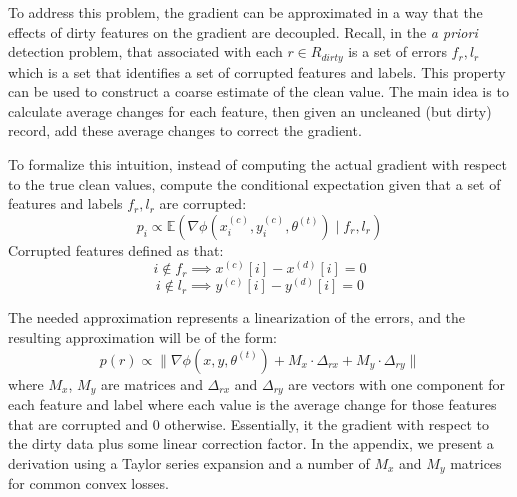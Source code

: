 To address this problem, the gradient can be approximated in a way that the effects of dirty features on the gradient are decoupled.
Recall, in the \emph{a priori} detection problem, that associated with each $r \in R_{dirty}$ is a set of errors $f_r,l_r$ which is a set that identifies a set of corrupted features and labels.
This property can be used to construct a coarse estimate of the clean value.
The main idea is to calculate average changes for each feature, then given an uncleaned (but dirty) record, add these average changes to correct the gradient.

To formalize this intuition, instead of computing the actual gradient with respect to the 
true clean values, compute the conditional expectation given that a set of features and labels $f_r,l_r$ are corrupted:
\[
p_i \propto \mathbb{E}(\nabla\phi(x^{(c)}_i,y^{(c)}_i,\theta^{(t)}) \mid f_r,l_r)
\]
Corrupted features defined as that:
\[
i \notin f_r \implies x^{(c)}[i] - x^{(d)}[i] = 0
\]
\[
i \notin l_r \implies y^{(c)}[i] - y^{(d)}[i] = 0
\]

The needed approximation represents a linearization of the errors, and the resulting approximation will be of the form:
\[
p(r)\propto\|\nabla\phi(x,y,\theta^{(t)}) + M_x \cdot \Delta_{rx} +  M_y \cdot \Delta_{ry}\|
\]
where $M_x$, $M_y$ are matrices and $\Delta_{rx}$ and $\Delta_{ry}$ are vectors with one component for each feature and label where each value is the average change for those features that are corrupted and 0 otherwise.
Essentially, it the gradient with respect to the dirty data plus some linear correction factor.
In the appendix, we present a derivation using a Taylor series expansion and a number of $M_x$ and $M_y$ matrices for common convex losses.

\iffalse
\subsubsection{More Accurate Early Error Estimates}\label{acc}
Linearization over avoids amplifying estimation error.
Consider the linear regression gradient:
\[
\nabla\phi(x,y,\theta) = (\theta^Tx - y)x
\]
This can be rewritten as a vector in each component:
\[
g[i] = \sum_{i} x[i]^2-x[i]y + \sum_{j \ne i} \theta[j]x[j]
\]
This function is already mostly linear in $x$ except for the one quadratic term.
However, this one quadratic term has potential to amplify errors.
Consider two expressions:
\[
f(x+\epsilon) = (x+\epsilon)^2 = x^2 + 2x\epsilon + \epsilon^2
\]
\[
f(x+\epsilon) \approx f(x) + f'(x)(\epsilon) = x^2 + 2x\epsilon
\]
The only difference between the two estimates is the quadratic $\epsilon^2$, if $\epsilon$ is highly uncertain random variable then the quadratic dominates.
If this variance is large, the Taylor estimate avoids amplifying this error.
Of course, this is at the tradeoff of some additional bias since the true function is non-linear.
We evaluate this linearization in Section \ref{est} against alternatives, and find that indeed it provides more accurate estimates for a small number of samples cleaned.
When the number of cleaned samples is large the alternative techniques are comparable or even slightly better.
\fi

